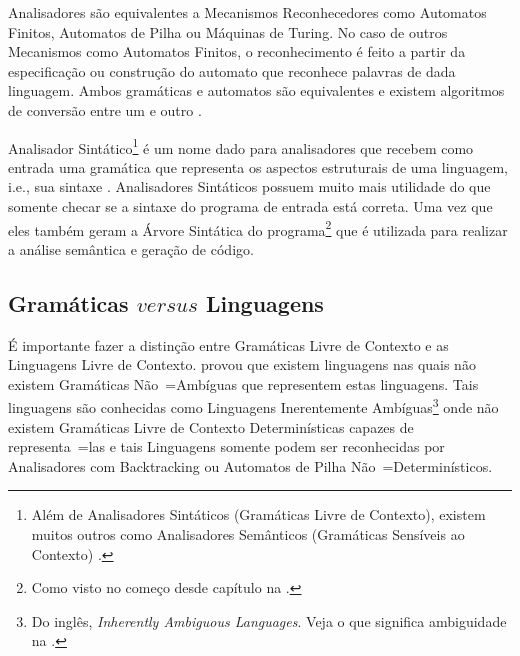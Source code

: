     Analisadores são equivalentes a Mecanismos Reconhecedores como Automatos Finitos,
    Automatos de Pilha ou
    Máquinas de Turing.
    No caso de outros Mecanismos como Automatos Finitos,
    o reconhecimento é feito a partir da especificação ou
    construção do automato que reconhece palavras de dada linguagem.
    Ambos gramáticas e
    automatos são equivalentes e
    existem algoritmos de conversão entre um e
    outro \cite{hopcroftBook}.

    Analisador Sintático\footnote{
    Além de Analisadores Sintáticos (Gramáticas Livre de Contexto),
    existem muitos outros como Analisadores Semânticos (Gramáticas Sensíveis ao Contexto) \cite{contextSensitiveParsing}.
    }
    é um nome dado para analisadores que recebem como entrada uma gramática que representa os aspectos estruturais de uma linguagem,
    i.e.,
    sua sintaxe \cite{ahoCompilerDragonBook}.
    Analisadores Sintáticos possuem muito mais utilidade do que somente checar se a sintaxe do programa de entrada está correta.
    Uma vez que eles também geram a Árvore Sintática do programa\footnote{
    Como visto no começo desde capítulo na .
    }
    que é utilizada para realizar a análise semântica e
    geração de código.


\subsection{Gramáticas $versus$ Linguagens}
\label{gramaticasVersusLinguagens}

    É importante fazer a distinção entre Gramáticas Livre de Contexto e
    as Linguagens Livre de Contexto.
     provou que existem linguagens nas quais não existem Gramáticas Não~=Ambíguas que representem estas linguagens.
    Tais linguagens são conhecidas como Linguagens Inerentemente Ambíguas\footnote{
    Do inglês,
    \textit{Inherently Ambiguous Languages}.
    Veja o que significa ambiguidade na .
    }
    onde não existem Gramáticas Livre de Contexto Determinísticas capazes de representa~=las e
    tais Linguagens somente podem ser reconhecidas por Analisadores com Backtracking \cite{ahoCompilerDragonBook} ou
    Automatos de Pilha Não~=Determinísticos.

